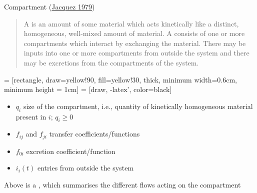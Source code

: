 \documentclass[aspectratio=43]{beamer}
\begin{document}
\begin{frame}{Compartment (\href{https://doi-org.uml.idm.oclc.org/10.1016/B978-0-12-434180-7.50021-8}{Jacquez 1979})}

\begin{quote}
  A  is an amount of some material which acts kinetically like a distinct, homogeneous, well-mixed amount of material. A  consists of one or more compartments which interact by exchanging the material. There may be inputs into one or more compartments from outside the system and there may be excretions from the compartments of the system.   
\end{quote}
\end{frame}

\begin{frame}{}
  \begin{minipage}{0.4\textwidth}
     = [rectangle, 
    draw=yellow!90, 
    fill=yellow!30, 
    thick, 
    minimum width=0.6cm,
    minimum height = 1cm]
     = [draw, 
    -latex', 
    color=black]
  \end{minipage}
  \begin{minipage}{0.55\textwidth}
    \begin{itemize}
      \item $q_i$ size of the compartment, i.e., quantity of kinetically homogeneous material present in $i$; $q_i\geq 0$ 
      \item $f_{ij}$ and $f_{ji}$ transfer coefficients/functions
      \item $f_{0i}$ excretion coefficient/function
      \item $i_i(t)$ entries from outside the system
    \end{itemize}
  \end{minipage}
  \vfill
  Above is a , which summarises the different flows acting on the compartment
\end{frame}
\end{document}
